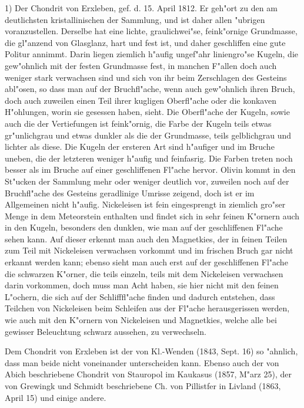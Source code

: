 \documentclass[a4paper, 11pt, oneside]{article}
\begin{document}
1) Der Chondrit von Erxleben, gef. d. 15. April 1812. Er geh"ort zu den am deutlichsten kristallinischen der Sammlung, und ist daher allen "ubrigen voranzustellen. Derselbe hat eine lichte, graulichwei"se, feink"ornige Grundmasse, die gl"anzend von Glasglanz, hart und fest ist, und daher geschliffen eine gute Politur annimmt. Darin liegen ziemlich h"aufig ungef"ahr liniengro"se Kugeln, die gew"ohnlich mit der festen Grundmasse fest, in manchen F"allen doch auch weniger stark verwachsen sind und sich von ihr beim Zerschlagen des Gesteins abl"osen, so dass man auf der Bruchfl"ache, wenn auch gew"ohnlich ihren Bruch, doch auch zuweilen einen Teil ihrer kugligen Oberfl"ache oder die konkaven H"ohlungen, worin sie gesessen haben, sieht. Die Oberfl"ache der Kugeln, sowie auch die der Vertiefungen ist feink"ornig, die Farbe der Kugeln teils etwas gr"unlichgrau und etwas dunkler als die der Grundmasse, teils gelblichgrau und lichter als diese. Die Kugeln der ersteren Art sind h"aufiger und im Bruche uneben, die der letzteren weniger h"aufig und feinfasrig. Die Farben treten noch besser als im Bruche auf einer geschliffenen Fl"ache hervor. Olivin kommt in den St"ucken der Sammlung mehr oder weniger deutlich vor, zuweilen noch auf der Bruchfl"ache des Gesteins geradlinige Umrisse zeigend, doch ist er im Allgemeinen nicht h"aufig. Nickeleisen ist fein eingesprengt in ziemlich gro"ser Menge in dem Meteorstein enthalten und findet sich in sehr feinen K"ornern auch in den Kugeln, besonders den dunklen, wie man auf der geschliffenen Fl"ache sehen kann. Auf dieser erkennt man auch den Magnetkies, der in feinen Teilen zum Teil mit Nickeleisen verwachsen vorkommt und im frischen Bruch gar nicht erkannt werden kann; ebenso sieht man auch erst auf der geschliffenen Fl"ache die schwarzen K"orner, die teils einzeln, teils mit dem Nickeleisen verwachsen darin vorkommen, doch muss man Acht haben, sie hier nicht mit den feinen L"ochern, die sich auf der Schlifffl"ache finden und dadurch entstehen, dass Teilchen von Nickeleisen beim Schleifen aus der Fl"ache herausgerissen werden, wie auch mit den K"ornern von Nickeleisen und Magnetkies, welche alle bei gewisser Beleuchtung schwarz aussehen, zu verwechseln.

Dem Chondrit von Erxleben ist der von Kl.-Wenden (1843, Sept. 16) so "ahnlich, dass man beide nicht voneinander unterscheiden kann. Ebenso auch der von Abich beschriebene Chondrit von Stauropol im Kaukasus (1857, M"arz 25), der von Grewingk und Schmidt beschriebene Ch. von Pillistfer in Livland (1863, April 15) und einige andere.
\end{document}
